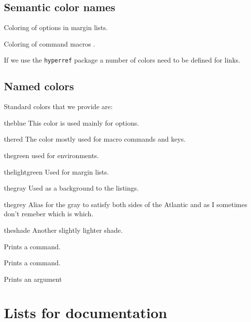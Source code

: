 \subsection{Semantic color names}
\begin{marglist}
\item [\option{theoption}] Coloring of options in margin lists.
\item [\option{themacro}] Coloring of command macros .
\item [\option{hyperlink}] If we use the \texttt{hyperref} package a number of colors need to be defined for links.
\end{marglist}

\subsection{Named colors}
Standard colors that we provide are:
\begin{marglist}
\item [\textcolor{theblue}{theblue}] This color is used mainly for options.
\item [\textcolor{thered}{thered}] The color mostly used for macro commands and keys.
\item [\textcolor{thegreen}{thegreen}] used for environments.
\item [\textcolor{thelightgreen}{thelightgreen}] Used for margin lists.
\item [\textcolor{thegray}{thegray}] Used as a background to the listings.
\item [\colorbox{thegrey}{\color{white}thegrey}] Alias for the gray to satisfy both sides of the Atlantic and as I sometimes don't remeber which is which.
\item [\colorbox{theshade}{theshade}] Another slightly lighter shade.
\end{marglist}



\begin{marglist}
\item [\cs{cs}]  Prints a command.
\item [\cs{cmd}] Prints a command.
\item[\cs{meta}]  Prints an argument
\end{marglist}




\section{Lists for documentation}



